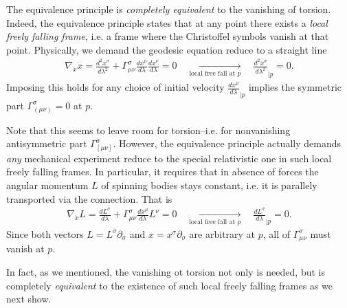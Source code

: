 \begin{mytheorem}
The equivalence principle is \emph{completely equivalent} to the vanishing of torsion.
Indeed, the equivalence principle states that at any point there exists a \emph{local freely falling frame}, i.e. a frame where the Christoffel symbols vanish at that point.
Physically, we demand the geodesic equation reduce to a straight line
\begin{align}
    \nabla_{\dot{x}}\dot{x} = \frac{d^2 x^{\sigma}}{d \lambda^2} + \Gamma^{\sigma}_{\mu \nu} \frac{d x^{\mu}}{d \lambda} \frac{d x^{\nu}}{d \lambda} = 0
    \quad \xrightarrow[\text{local free fall at $p$}]{} \quad
    \frac{d^2 x^{\sigma}}{d \lambda^2}_{\mid p} = 0.
\end{align} 
Imposing this holds for any choice of initial velocity \(\frac{d x^{\mu}}{d \lambda}_{\mid p}\) implies the symmetric part $\Gamma_{(\mu\nu)}^\sigma=0$ at \(p\).

Note that this seems to leave room for torsion--i.e. for nonvanishing antisymmetric part $\Gamma_{[\mu\nu]}^\sigma$.
However, the equivalence principle actually demands \emph{any} mechanical experiment reduce to the special relativistic one in such local freely falling frames.
In particular, it requires that in absence of forces the angular momentum $L$ of spinning bodies stays constant, i.e. it is parallely transported via the connection.
That is 
\begin{align}
    \nabla_{\dot{x}}L = \frac{d L^\sigma}{d \lambda} + \Gamma^{\sigma}_{\mu \nu} \frac{d x^\mu}{d \lambda} L^\nu = 0
    \quad \xrightarrow[\text{local free fall at $p$}]{} \quad
    \frac{d L^\sigma}{d \lambda}_{\mid p} = 0.
\end{align}
Since both vectors $L=L^\sigma \partial_\sigma$ and $x=x^\sigma \partial_\sigma$ are arbitrary at \(p\), all of $\Gamma_{\mu\nu}^\sigma$ must vanish at \(p\).

In fact, as we mentioned, the vanishing ot torsion not only is needed, but is completely \emph{equivalent} to the existence of such local freely falling frames as we next show.
\end{mytheorem}


